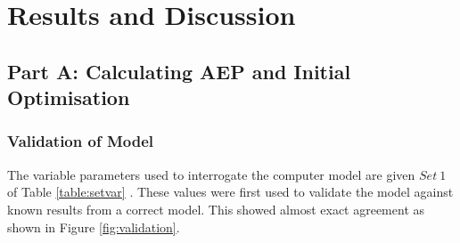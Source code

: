 \documentclass[11pt]{article}
\begin{document}
\section{Results and Discussion}
\subsection{Part A: Calculating AEP and Initial Optimisation}
\subsubsection{Validation of Model}
The variable parameters used to interrogate the computer model are given $Set \ 1$ of Table \ref{table:setvar} . These values were first used to validate the model against known results from a correct model. This showed almost exact agreement as shown in Figure \ref{fig:validation}.
\end{document}
